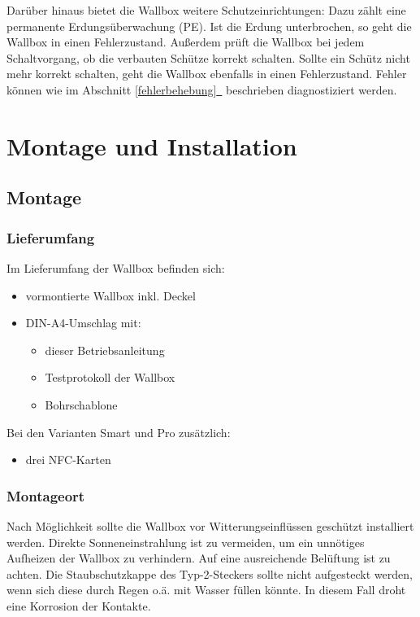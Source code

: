 \documentclass[a4paper,10pt]{article}
\newcommand*{\fullref}[1]{Abschnitt \hyperref[{#1}]{\ref*{#1}~\nameref*{#1}}}
\begin{document}
\begin{multicols*}{2}
    Darüber hinaus bietet die Wallbox weitere Schutzeinrichtungen: Dazu zählt eine
    permanente Erdungsüberwachung (PE). Ist die Erdung unterbrochen, so geht die
    Wallbox in einen Fehlerzustand. Außerdem prüft die Wallbox bei jedem
    Schaltvorgang, ob die verbauten Schütze korrekt schalten. Sollte ein
    Schütz nicht mehr korrekt schalten, geht die Wallbox ebenfalls in einen Fehlerzustand.
    Fehler können wie im \fullref{fehlerbehebung} beschrieben diagnostiziert werden.

    \newpage
    \section{Montage und Installation}
    \subsection{Montage}
    \subsubsection{Lieferumfang}
    Im Lieferumfang der Wallbox befinden sich:
    \begin{itemize}
        \item vormontierte Wallbox inkl. Deckel
        \item DIN-A4-Umschlag mit:
        \begin{itemize}
            \item dieser Betriebsanleitung
            \item Testprotokoll der Wallbox
            \item Bohrschablone
        \end{itemize}
    \end{itemize}
    Bei den Varianten Smart und Pro zusätzlich:
    \begin{itemize}
        \item drei NFC-Karten
    \end{itemize}


    \subsubsection{Montageort}
    Nach Möglichkeit sollte die Wallbox vor Witterungseinflüssen geschützt
    installiert werden. Direkte Sonneneinstrahlung ist zu vermeiden, um ein
    unnötiges Aufheizen der Wallbox zu verhindern. Auf eine ausreichende Belüftung
    ist zu achten. Die Staubschutzkappe des Typ-2-Steckers sollte nicht aufgesteckt
    werden, wenn sich diese durch Regen o.ä. mit Wasser füllen könnte. In diesem Fall
    droht eine Korrosion der Kontakte.


\end{multicols*}
\end{document}
